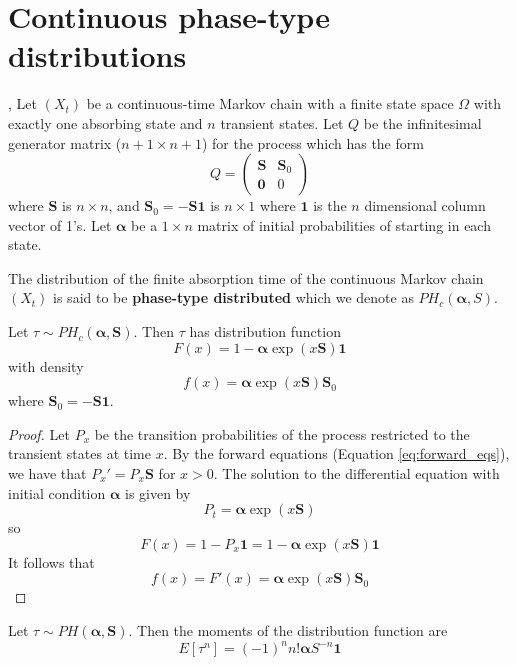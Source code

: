 \section{Continuous phase-type distributions}
\begin{defn} %
\cite{neuts1981}, \cite{maier1992}
Let $(X_t)$ be a continuous-time Markov chain with a finite state space $\Omega$ with exactly one absorbing state and $n$ transient states.
Let $Q$ be the infinitesimal generator matrix ($n + 1 \times n + 1$) for the process which has the form
$$
Q = \begin{pmatrix}
\mathbf{S} & \mathbf{S}_0\\
\mathbf{0} & 0
\end{pmatrix}
$$
where $\mathbf{S}$ is $n \times n$, and $\mathbf{S}_0 = - \mathbf{S} \mathbf{1}$ is $n \times 1$ where $\mathbf{1}$ is the $n$ dimensional column vector of 1's.
Let $\boldsymbol{\alpha}$ be a $1 \times n$ matrix of initial probabilities of starting in each state.

The distribution of the finite absorption time of the  continuous Markov chain $(X_t)$ is said to be \textbf{phase-type distributed} which we denote as $PH_c(\boldsymbol{\alpha}, S)$.
\end{defn}

\begin{theorem} \label{thm:phase-type-pdf-cdf}
Let $\tau \sim PH_c(\boldsymbol{\alpha}, \mathbf{S})$.
Then $\tau$ has distribution function
$$
F(x) = 1 - \boldsymbol{\alpha} \exp(x \mathbf{S}) \mathbf{1}
$$
with density
$$
f(x) = \boldsymbol{\alpha} \exp(x \mathbf{S}) \mathbf{S}_0
$$
where
$\mathbf{S}_0 = - \mathbf{S 1}$.
\end{theorem}

\begin{proof}
Let $P_x$ be the transition probabilities of the process restricted to the transient states at time $x$.
By the forward equations (Equation \eqref{eq:forward_eqs}), we have that $P_x' = P_x \mathbf{S}$ for $x > 0$.
The solution to the differential equation with initial condition $\boldsymbol{\alpha}$ is given by
$$
P_t = \boldsymbol{\alpha} \exp(x \mathbf{S})
$$
so
$$
F(x) = 1 - P_x \mathbf{1} = 1 - \boldsymbol{\alpha} \exp(x \mathbf{S}) \mathbf{1}
$$
It follows that
$$
f(x) = F'(x) = \boldsymbol{\alpha} \exp(x \mathbf{S}) \mathbf{S}_0
$$
\end{proof}

\begin{theorem} \label{thm:phase-moments}
Let $\tau \sim PH(\boldsymbol{\alpha}, \mathbf{S})$.
Then the moments of the distribution function are
$$
E[\tau^{{n}}]=(-1)^{{n}}n!{\boldsymbol  {\alpha }}{S}^{{-n}}{\mathbf  {1}}
$$
\end{theorem}

